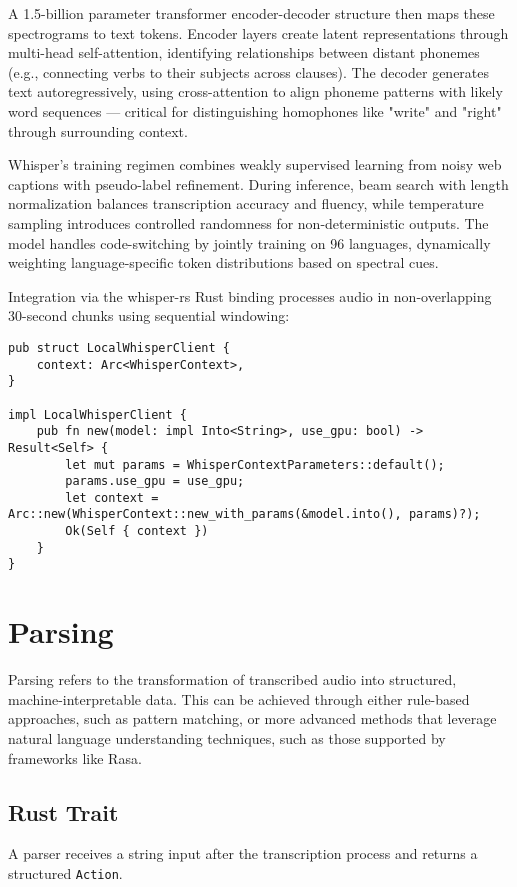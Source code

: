 A 1.5-billion parameter transformer encoder-decoder structure then maps these
spectrograms to text tokens. Encoder layers create latent representations through
multi-head self-attention, identifying relationships between distant phonemes
(e.g., connecting verbs to their subjects across clauses). The decoder generates
text autoregressively, using cross-attention to align phoneme patterns with
likely word sequences --- critical for distinguishing homophones like "write" and "right"
through surrounding context.

Whisper's training regimen combines weakly supervised learning from noisy web captions
with pseudo-label refinement. During inference, beam search with length normalization
balances transcription accuracy and fluency, while temperature sampling introduces
controlled randomness for non-deterministic outputs. The model handles code-switching
by jointly training on 96 languages, dynamically weighting language-specific token
distributions based on spectral cues.

Integration via the whisper-rs Rust binding processes audio in non-overlapping
30-second chunks using sequential windowing:

\begin{verbatim}
pub struct LocalWhisperClient {
    context: Arc<WhisperContext>,
}

impl LocalWhisperClient {
    pub fn new(model: impl Into<String>, use_gpu: bool) -> Result<Self> {
        let mut params = WhisperContextParameters::default();
        params.use_gpu = use_gpu;
        let context = Arc::new(WhisperContext::new_with_params(&model.into(), params)?);
        Ok(Self { context })
    }
}
\end{verbatim}

\section{Parsing}
Parsing refers to the transformation of transcribed audio into structured, machine-interpretable data.
This can be achieved through either rule-based approaches, such as pattern matching,
or more advanced methods that leverage natural language understanding techniques, such as those supported by frameworks like Rasa.

\subsection{Rust Trait}
A parser receives a string input after the transcription process and returns a structured \texttt{Action}.

